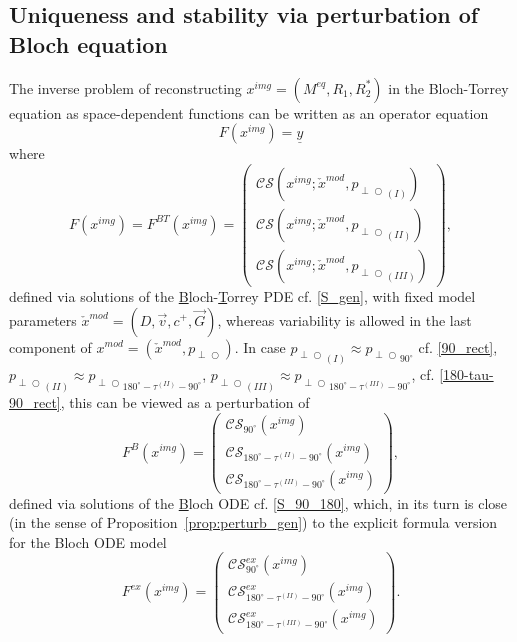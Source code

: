 \documentclass{ws-m3as}
\def\pp{p_{\perp\!\!\!\!\!\bigcirc}}
\newcommand\tauone{\tau^{(II)}}
\newcommand\tautwo{\tau^{(III)}}
\newcommand{\revisionown}[1]{{ #1}}
\begin{document}
\subsection{Uniqueness and stability via perturbation of Bloch equation}\label{sec:uniqueness_perturbation}
The inverse problem of reconstructing $x^{img}=(M^{eq},R_1,R_2^*)$ in the Bloch-Torrey equation as space-dependent functions can be written as an operator equation
\begin{equation}\label{Fxy}
F(x^{img})=\underline{y}
\end{equation}
where 
\begin{equation}\label{F_gen}
F(x^{img})=\revisionown{F^{BT}(x^{img})=}\left(\begin{array}{c}
\mathcal{C}\mathcal{S}(x^{img};\check{x}^{mod},{\pp}_{(I)})\\
\mathcal{C}\mathcal{S}(x^{img};\check{x}^{mod},{\pp}_{(II)})\\
\mathcal{C}\mathcal{S}(x^{img};\check{x}^{mod},{\pp}_{(III)})
\end{array}\right),
\end{equation}
\revisionown{defined via solutions of the \underline{B}loch-\underline{T}orrey PDE}
cf. \eqref{S_gen}, with fixed model parameters $\check{x}^{mod}=(D,\vec v,c^+,\vec G)$, whereas variability is allowed in the last component of ${x}^{mod}=(\check{x}^{mod},\pp)$.
In case  
${\pp}_{(I)}\approx {\pp}_{90^\circ}$ cf. \eqref{90_rect},
${\pp}_{(II)}\approx {\pp}_{180^\circ-\tauone-90^\circ}$, 
${\pp}_{(III)}\approx {\pp}_{180^\circ-\tautwo-90^\circ}$, cf. \eqref{180-tau-90_rect}, this can be viewed as a perturbation of 
\begin{equation}\label{F}
\revisionown{F^{B}}(x^{img})=\left(\begin{array}{c}
\mathcal{C}\mathcal{S}_{90^\circ}(x^{img})\\
\mathcal{C}\mathcal{S}_{180^\circ-\tauone-90^\circ}(x^{img})\\
\mathcal{C}\mathcal{S}_{180^\circ-\tautwo-90^\circ}(x^{img})
\end{array}\right),
\end{equation}
\revisionown{defined via solutions of the \underline{B}loch ODE}
cf. \eqref{S_90_180}, which, in its turn is close (in the sense of Proposition~\ref{prop:perturb_gen}) to the explicit formula version for the Bloch ODE model
\begin{equation}\label{F_ex}
F^{ex}(x^{img})=\left(\begin{array}{c}
\mathcal{C}\mathcal{S}_{90^\circ}^{ex}(x^{img})\\
\mathcal{C}\mathcal{S}_{180^\circ-\tauone-90^\circ}^{ex}(x^{img})\\
\mathcal{C}\mathcal{S}_{180^\circ-\tautwo-90^\circ}^{ex}(x^{img})
\end{array}\right).
\end{equation}
\end{document}
